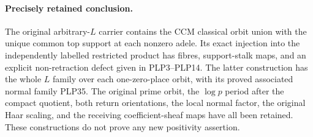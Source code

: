 \paragraph{Precisely retained conclusion.}
The original arbitrary-$L$ carrier contains the CCM classical
orbit union with the unique common top support at each nonzero
adele. Its exact injection into the independently labelled
restricted product has fibres, support-stalk maps, and an explicit
non-retraction defect given in PLP3--PLP14. The latter construction
has the whole $L$ family over each one-zero-place orbit, with its
proved associated normal family PLP35. The original prime orbit,
the $\log p$ period after the compact quotient, both return
orientations, the local normal factor, the original Haar scaling,
and the receiving coefficient-sheaf maps have all been retained.
These constructions do not prove any new positivity assertion.
